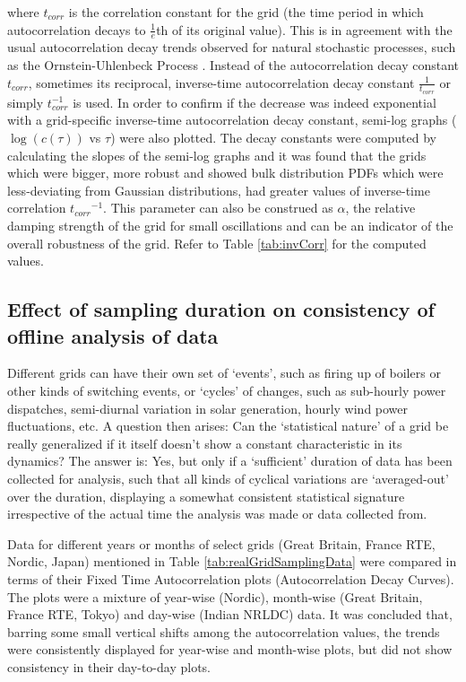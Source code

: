 where $t_{corr}$ is the correlation constant for the grid (the time period in which autocorrelation decays to $\frac{1}{e}$th of its original value). This is in agreement with the usual autocorrelation decay trends observed for natural stochastic processes, such as the Ornstein-Uhlenbeck Process \cite{numericalSolutionForStochasticDifferentailEquationsKloedenEckhard}. 
Instead of the autocorrelation decay constant $t_{corr}$, sometimes its reciprocal, inverse-time autocorrelation decay constant $\frac{1}{t_{corr}}$ or simply $t_{corr}^{-1}$ is used.   
In order to confirm if the decrease was indeed exponential with a grid-specific inverse-time autocorrelation decay constant, semi-log graphs ($\log(c(\tau))$ vs $\tau$) were also plotted. The decay constants were computed by calculating the slopes of the semi-log graphs and it was found that the grids which were bigger, more robust and showed bulk distribution PDFs which were less-deviating from Gaussian distributions, had greater values of inverse-time correlation ${t_{corr}}^{-1}$. This parameter can also be construed as $\alpha$, the relative damping strength of the grid for small oscillations and can be an indicator of the overall robustness of the grid. Refer to Table \ref{tab:invCorr} for the computed values.



\subsection*{Effect of sampling duration on consistency of offline analysis of data}
\label{app:effectOfSamplingDuration}

Different grids can have their own set of `events', such as firing up of boilers or other kinds of switching events, or `cycles' of changes, such as sub-hourly power dispatches, semi-diurnal variation in solar generation, hourly wind power fluctuations, etc. A question then arises: Can the `statistical nature' of a grid be really generalized if it itself doesn't show a constant characteristic in its dynamics? The answer is: Yes, but only if a `sufficient' duration of data has been collected for analysis, such that all kinds of cyclical variations are `averaged-out' over the duration, displaying a somewhat consistent statistical signature irrespective of the actual time the analysis was made or data collected from.

Data for different years or months of select grids (Great Britain, France RTE, Nordic, Japan) mentioned in Table \ref{tab:realGridSamplingData} were compared in terms of their Fixed Time Autocorrelation plots (Autocorrelation Decay Curves). The plots were a mixture of year-wise (Nordic), month-wise (Great Britain, France RTE, Tokyo) and day-wise (Indian NRLDC) data. It was concluded that, barring some small vertical shifts among the autocorrelation values, the trends were consistently displayed for year-wise and month-wise plots, but did not show consistency in their day-to-day plots. 


